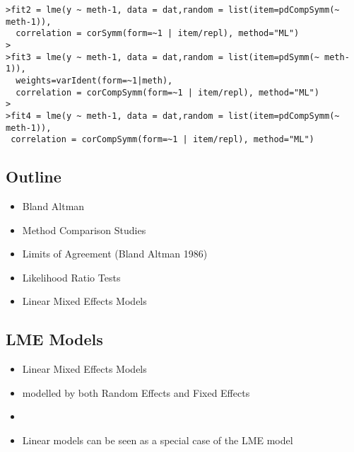 \begin{frame}{\bf {}}
\begin{frame}{\bf {}}
\begin{itemize}
\begin{frame}[fragile]{\bf {}}
\begin{verbatim}
>fit2 = lme(y ~ meth-1, data = dat,random = list(item=pdCompSymm(~ meth-1)),
  correlation = corSymm(form=~1 | item/repl), method="ML")
>
>fit3 = lme(y ~ meth-1, data = dat,random = list(item=pdSymm(~ meth-1)),
  weights=varIdent(form=~1|meth),
  correlation = corCompSymm(form=~1 | item/repl), method="ML")
>
>fit4 = lme(y ~ meth-1, data = dat,random = list(item=pdCompSymm(~ meth-1)),
 correlation = corCompSymm(form=~1 | item/repl), method="ML")

\end{verbatim}
\end{frame}

\subsection{Outline}
\begin{frame}{\bf {}}
\begin{itemize}\itemsep0.7cm
\item Bland Altman
\item Method Comparison Studies
\item Limits of Agreement (Bland Altman 1986)
\item Likelihood Ratio Tests
\item Linear Mixed Effects Models
\end{itemize}
\end{frame}
\subsection{LME Models}
\begin{frame}{\bf {}}
\begin{itemize}\itemsep0.7cm
\item Linear Mixed Effects Models
\item modelled by both Random Effects and Fixed Effects
\item
\item Linear models can be seen as a special case of the LME model

\end{itemize}
\end{frame}

\end{itemize}
\end{frame}
\end{frame}
